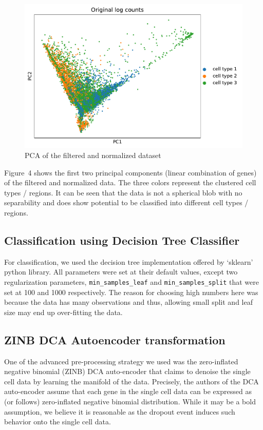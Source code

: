 \begin{figure}
\includegraphics[width=\linewidth]{pca_og_log_counts.pdf}
\caption{PCA of the filtered and normalized dataset}
\end{figure}

Figure~4 shows the first two principal components (linear combination of genes) of the filtered and normalized data. The three colors represent the clustered cell types / regions. It can be seen that the data is not a spherical blob with no separability and does show potential to be classified into different cell types / regions.

\subsection*{Classification using Decision Tree Classifier}

For classification, we used the decision tree implementation offered by `sklearn' python library. All parameters were set at their default values, except two regularization parameters, \texttt{min\_samples\_leaf} and \texttt{min\_samples\_split} that were set at 100 and 1000 respectively. The reason for choosing high numbers here was because the data has many observations and thus, allowing small split and leaf size may end up over-fitting the data.

\subsection*{ZINB DCA Autoencoder transformation}

One of the advanced pre-processing strategy we used was the zero-inflated negative binomial (ZINB) DCA auto-encoder \citep{eraslan2018single} that claims to denoise the single cell data by learning the manifold of the data. Precisely, the authors of the DCA auto-encoder assume that each gene in the single cell data can be expressed as (or follows) zero-inflated negative binomial distribution. While it may be a bold assumption, we believe it is reasonable as the dropout event induces such behavior onto the single cell data. 

